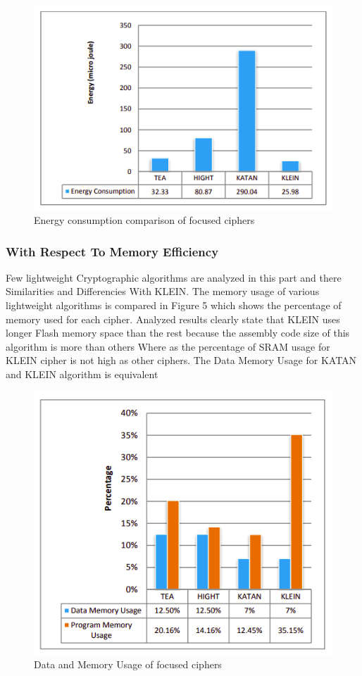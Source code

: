 \documentclass[preprint]{transcrypto}
\begin{document}
\begin{figure}
    \centering
    \includegraphics[width= 75 mm]{images/EC.png} 
    \caption{Energy consumption comparison of focused ciphers}
    \label{fig:6distinguisher}
\end{figure}

\subsubsection{With Respect To Memory Efficiency}

Few lightweight Cryptographic algorithms are analyzed in this part and there Similarities and Differencies With KLEIN. The memory usage of various lightweight algorithms is compared in
Figure 5 which shows the percentage of memory used for each cipher. Analyzed results clearly state that  KLEIN uses longer Flash memory space than the rest because the assembly code size of this algorithm is more than others Where as the percentage of SRAM usage for KLEIN cipher is not high as other ciphers. The Data Memory Usage for KATAN and KLEIN algorithm is equivalent\\

\begin{figure}
    \centering
    \includegraphics[width= 75 mm]{images/DM.png} 
    \caption{Data and Memory Usage of focused ciphers}
    \label{fig:6distinguisher}
\end{figure}
\end{document}
